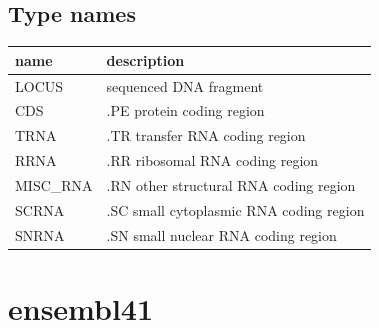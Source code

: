 \documentclass{article}
\begin{document}
\begin{Schunk}
\subsection{Type names}
\noindent\begin{tabular}{ll}
\hline \hline
name & description\\
\hline
LOCUS & sequenced DNA fragment \\
CDS & .PE protein coding region \\
TRNA & .TR transfer RNA coding region \\
RRNA & .RR ribosomal RNA coding region \\
MISC\_RNA & .RN other structural RNA coding region \\
SCRNA & .SC small cytoplasmic RNA coding region \\
SNRNA & .SN small nuclear RNA coding region \\
\hline \hline
\end{tabular}

\section{ ensembl41 }

\end{Schunk}
\end{document}
